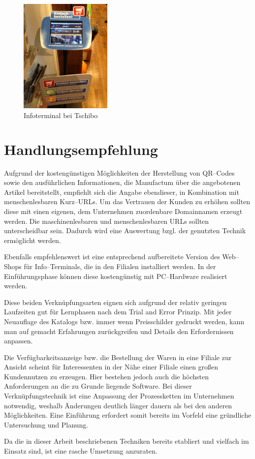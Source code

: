 \begin{figure}[H]
\begin{center}
\includegraphics[width=0.4\textwidth]{Tschibo-Infoterminal.jpg}
\caption{Infoterminal bei Tschibo}
\label{pic:tschiboit}
\end{center}
\end{figure}

\section{Handlungsempfehlung}
\label{hempf}

Aufgrund der kostengünstigen Möglichkeiten der Herstellung von QR--Codes sowie den ausführlichen Informationen, die Manufactum über die angebotenen Artikel bereitstellt, empfiehlt sich die Angabe ebendieser, in Kombination mit menschenlesbaren Kurz--URLs. Um das Vertrauen der Kunden zu erhöhen sollten diese mit einen eigenen, dem Unternehmen zuordenbare Domainnamen erzeugt werden. Die maschinenlesbaren und menschenlesbaren URLs sollten unterscheidbar sein. Dadurch wird eine Auswertung bzgl. der genutzten Technik ermöglicht werden.

Ebenfalls empfehlenswert ist eine entsprechend aufbereitete Version des Web--Shops für Info--Terminals, die in den Filialen installiert werden. In der Einführungsphase können diese kostengünstig mit PC--Hardware realisiert werden.

Diese beiden Verknüpfungsarten eignen sich aufgrund der relativ geringen Laufzeiten gut für Lernphasen nach dem Trial and Error Prinzip. Mit jeder Neuauflage des Katalogs bzw. immer wenn Preisschilder gedruckt werden, kann man auf gemacht Erfahrungen zurückgreifen und Details den Erfordernissen anpassen.

Die Verfügbarkeitsanzeige bzw. die Bestellung der Waren in eine Filiale zur Ansicht scheint für Interessenten in der Nähe einer Filiale einen großen Kundennutzen zu erzeugen. Hier bestehen jedoch auch die höchsten Anforderungen an die zu Grunde liegende Software. Bei dieser Verknüpfungstechnik ist eine Anpassung der Prozessketten im Unternehmen notwendig, weshalb Änderungen deutlich länger dauern als bei den anderen Möglichkeiten. Eine Einführung erfordert somit bereits im Vorfeld eine gründliche Untersuchung und Planung. 

Da die in dieser Arbeit beschriebenen Techniken bereits etabliert und vielfach im Einsatz sind, ist eine rasche Umsetzung anzuraten.










